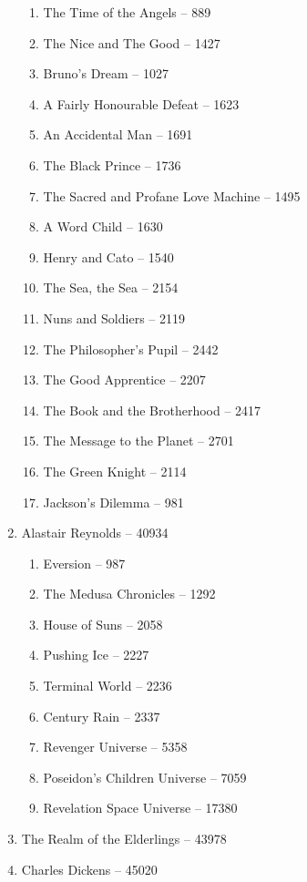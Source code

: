 \documentclass[a4paper, 11pt]{proc} %
\begin{document}
\begin{enumerate}
\begin{enumerate}
            \item The Time of the Angels -- 889
            \item The Nice and The Good -- 1427
            \item Bruno's Dream -- 1027
            \item A Fairly Honourable Defeat -- 1623
            \item An Accidental Man -- 1691
            \item The Black Prince -- 1736
            \item The Sacred and Profane Love Machine -- 1495
            \item A Word Child -- 1630
            \item Henry and Cato -- 1540
            \item The Sea, the Sea -- 2154
            \item Nuns and Soldiers -- 2119
            \item The Philosopher's Pupil -- 2442
            \item The Good Apprentice -- 2207
            \item The Book and the Brotherhood -- 2417
            \item The Message to the Planet -- 2701
            \item The Green Knight -- 2114
            \item Jackson's Dilemma -- 981
        \end{enumerate}
    \item Alastair Reynolds -- 40934
        \begin{enumerate}
            \item Eversion -- 987
            \item The Medusa Chronicles -- 1292
            \item House of Suns -- 2058
            \item Pushing Ice -- 2227
            \item Terminal World -- 2236
            \item Century Rain -- 2337
            \item Revenger Universe -- 5358
            \item Poseidon's Children Universe -- 7059
            \item Revelation Space Universe -- 17380
        \end{enumerate}
    \item The Realm of the Elderlings -- 43978
    \item Charles Dickens -- 45020

\end{enumerate}
\end{document}
